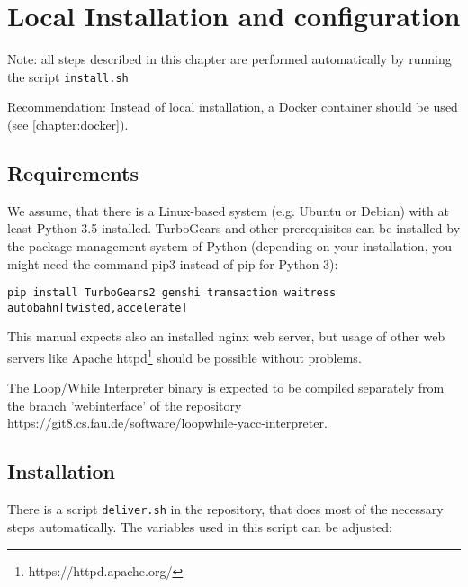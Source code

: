 \chapter{Local Installation and configuration}
\label{chapter:installation}
\begin{warning}
Note: all steps described in this chapter are performed automatically by running the script \verb|install.sh|
\end{warning}
\begin{warning}
Recommendation: Instead of local installation, a Docker container should be used (see \autoref{chapter:docker}).
\end{warning}

\section{Requirements}
We assume, that there is a Linux-based system (e.g. Ubuntu or Debian) with at least Python 3.5 installed. TurboGears and other prerequisites can
be installed by the package-management system of Python (depending on your installation, you might need the command pip3 instead of pip for Python 3):

\begin{verbatim}
pip install TurboGears2 genshi transaction waitress autobahn[twisted,accelerate]
\end{verbatim}

This manual expects also an installed nginx web server, but usage of other web servers like Apache httpd\footnote{https://httpd.apache.org/}
should be possible without problems.

The Loop/While Interpreter binary is expected to be compiled separately from the branch
\mbox{'webinterface'} of the repository\\
\url{https://git8.cs.fau.de/software/loopwhile-yacc-interpreter}.


\section{Installation}
\label{section:installation}
There is a script \verb|deliver.sh| in the repository, that does most of the necessary
steps automatically. The variables used in this script can be adjusted:


